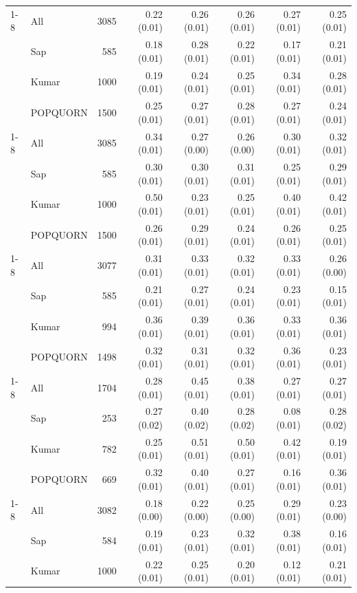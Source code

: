 \begin{table}[t]
\begin{tabular}{llrrrrrr}
\cline{1-8}
\multirow[t]{4}{*}{Qwen 32B} & All & 3085 & 0.22 (0.01) & 0.26 (0.01) & 0.26 (0.01) & 0.27 (0.01) & 0.25 (0.01) \\
 & Sap & 585 & 0.18 (0.01) & 0.28 (0.01) & 0.22 (0.01) & 0.17 (0.01) & 0.21 (0.01) \\
 & Kumar & 1000 & 0.19 (0.01) & 0.24 (0.01) & 0.25 (0.01) & 0.34 (0.01) & 0.28 (0.01) \\
 & POPQUORN & 1500 & 0.25 (0.01) & 0.27 (0.01) & 0.28 (0.01) & 0.27 (0.01) & 0.24 (0.01) \\
\cline{1-8}
\multirow[t]{4}{*}{Qwen 7B} & All & 3085 & 0.34 (0.01) & 0.27 (0.00) & 0.26 (0.00) & 0.30 (0.01) & 0.32 (0.01) \\
 & Sap & 585 & 0.30 (0.01) & 0.30 (0.01) & 0.31 (0.01) & 0.25 (0.01) & 0.29 (0.01) \\
 & Kumar & 1000 & 0.50 (0.01) & 0.23 (0.01) & 0.25 (0.01) & 0.40 (0.01) & 0.42 (0.01) \\
 & POPQUORN & 1500 & 0.26 (0.01) & 0.29 (0.01) & 0.24 (0.01) & 0.26 (0.01) & 0.25 (0.01) \\
\cline{1-8}
\multirow[t]{4}{*}{Mistral 7B} & All & 3077 & 0.31 (0.01) & 0.33 (0.01) & 0.32 (0.01) & 0.33 (0.01) & 0.26 (0.00) \\
 & Sap & 585 & 0.21 (0.01) & 0.27 (0.01) & 0.24 (0.01) & 0.23 (0.01) & 0.15 (0.01) \\
 & Kumar & 994 & 0.36 (0.01) & 0.39 (0.01) & 0.36 (0.01) & 0.33 (0.01) & 0.36 (0.01) \\
 & POPQUORN & 1498 & 0.32 (0.01) & 0.31 (0.01) & 0.32 (0.01) & 0.36 (0.01) & 0.23 (0.01) \\
\cline{1-8}
\multirow[t]{4}{*}{Mistral 24B} & All & 1704 & 0.28 (0.01) & 0.45 (0.01) & 0.38 (0.01) & 0.27 (0.01) & 0.27 (0.01) \\
 & Sap & 253 & 0.27 (0.02) & 0.40 (0.02) & 0.28 (0.02) & 0.08 (0.01) & 0.28 (0.02) \\
 & Kumar & 782 & 0.25 (0.01) & 0.51 (0.01) & 0.50 (0.01) & 0.42 (0.01) & 0.19 (0.01) \\
 & POPQUORN & 669 & 0.32 (0.01) & 0.40 (0.01) & 0.27 (0.01) & 0.16 (0.01) & 0.36 (0.01) \\
\cline{1-8}
\multirow[t]{4}{*}{Gemma 5B} & All & 3082 & 0.18 (0.00) & 0.22 (0.00) & 0.25 (0.00) & 0.29 (0.01) & 0.23 (0.00) \\
 & Sap & 584 & 0.19 (0.01) & 0.23 (0.01) & 0.32 (0.01) & 0.38 (0.01) & 0.16 (0.01) \\
 & Kumar & 1000 & 0.22 (0.01) & 0.25 (0.01) & 0.20 (0.01) & 0.12 (0.01) & 0.21 (0.01) \\

\end{tabular}
\end{table}
